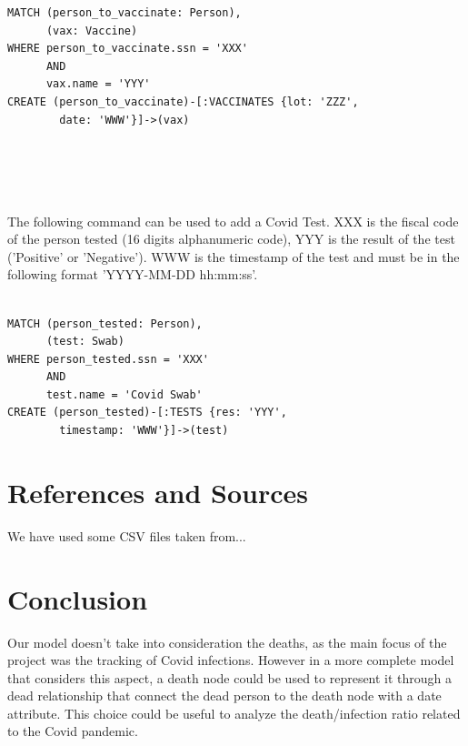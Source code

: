 \documentclass{article}
\begin{document}
\begin{lstlisting}[language=cypher, label=lst:cypher-example]
MATCH (person_to_vaccinate: Person),
      (vax: Vaccine)
WHERE person_to_vaccinate.ssn = 'XXX' 
      AND 
      vax.name = 'YYY'
CREATE (person_to_vaccinate)-[:VACCINATES {lot: 'ZZZ', 
        date: 'WWW'}]->(vax)
        
\end{lstlisting}\\
\\
\\The following command can be used to add a Covid Test. XXX is the fiscal code of the person tested (16 digits alphanumeric code), YYY is the result of the test ('Positive' or 'Negative'). WWW is the timestamp of the test and must be in the following format 'YYYY-MM-DD hh:mm:ss'.

\begin{lstlisting}[language=cypher, label=lst:cypher-example]

MATCH (person_tested: Person),
      (test: Swab)
WHERE person_tested.ssn = 'XXX' 
      AND 
      test.name = 'Covid Swab'
CREATE (person_tested)-[:TESTS {res: 'YYY', 
        timestamp: 'WWW'}]->(test)

\end{lstlisting}



\section{References and Sources}
We have used some CSV files taken from...

\section{Conclusion}

Our model doesn't take into consideration the deaths, as the main focus of the project was the tracking of Covid infections. However in a more complete model that considers this aspect, a death node could be used to represent it through a dead relationship that connect the dead person to the death node with a date attribute. This choice could be useful to analyze the death/infection ratio related to the Covid pandemic.
\end{document}
